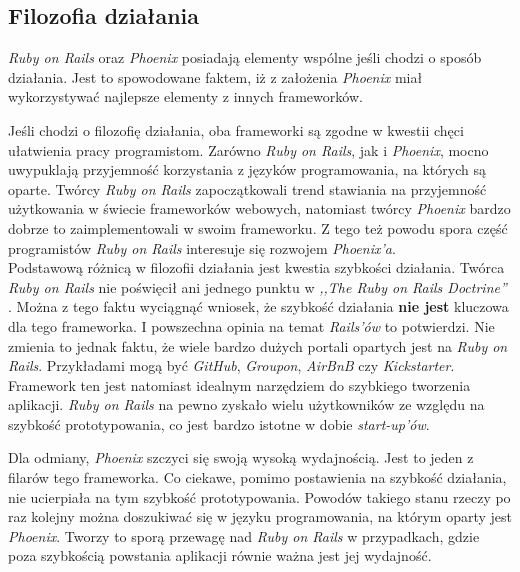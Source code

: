 
\subsection{Filozofia działania}
\textit{Ruby on Rails} oraz \textit{Phoenix} posiadają elementy wspólne jeśli chodzi o sposób działania. Jest to spowodowane faktem, iż z założenia \textit{Phoenix} miał wykorzystywać najlepsze elementy z innych frameworków.

Jeśli chodzi o filozofię działania, oba frameworki są zgodne w kwestii chęci ułatwienia pracy programistom. Zarówno \textit{Ruby on Rails}, jak i \textit{Phoenix}, mocno uwypuklają przyjemność korzystania z języków programowania, na których są oparte. Twórcy \textit{Ruby on Rails} zapoczątkowali trend stawiania na przyjemność użytkowania w świecie frameworków webowych, natomiast twórcy \textit{Phoenix} bardzo dobrze to zaimplementowali w swoim frameworku. Z tego też powodu spora część programistów \textit{Ruby on Rails} interesuje się rozwojem \textit{Phoenix'a}.\\

Podstawową różnicą w filozofii działania jest kwestia szybkości działania. Twórca \textit{Ruby on Rails} nie poświęcił ani jednego punktu w \emph{,,The Ruby on Rails Doctrine''} \cite{rails_doctrine}. Można z tego faktu wyciągnąć wniosek, że szybkość działania \textbf{nie jest} kluczowa dla tego frameworka. I powszechna opinia na temat \textit{Rails'ów} to potwierdzi. Nie zmienia to jednak faktu, że wiele bardzo dużych portali opartych jest na \textit{Ruby on Rails}. Przykładami mogą być \textit{GitHub}, \textit{Groupon}, \textit{AirBnB} czy \textit{Kickstarter}. Framework ten jest natomiast idealnym narzędziem do szybkiego tworzenia aplikacji. \textit{Ruby on Rails} na pewno zyskało wielu użytkowników ze względu na szybkość prototypowania, co jest bardzo istotne w dobie \textit{start-up'ów}.

Dla odmiany, \textit{Phoenix} szczyci się swoją wysoką wydajnością. Jest to jeden z filarów tego frameworka. Co ciekawe, pomimo postawienia na szybkość działania, nie ucierpiała na tym szybkość prototypowania. Powodów takiego stanu rzeczy po raz kolejny można doszukiwać się w języku programowania, na którym oparty jest \textit{Phoenix}. Tworzy to sporą przewagę nad \textit{Ruby on Rails} w przypadkach, gdzie poza szybkością powstania aplikacji równie ważna jest jej wydajność.

